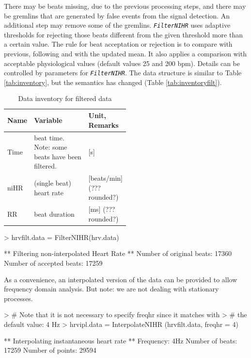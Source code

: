 \documentclass[a4paper, english, utf8]{amsart}
\newcommand\code[1]{\textsl{\texttt{#1}}}
\begin{document}
There may be beats missing, due to the previous processing steps, and there may be gremlins that are 
generated by false events from the signal detection. An additional step may remove  some of the gremlins. 
\code{FilterNIHR} uses adaptive thresholds for rejecting those beats different from the given threshold 
more than a certain value. The rule for beat acceptation or rejection is to compare with previous, following 
and with the updated mean. It also applies a comparison with acceptable physiological values (default 
values 25 and 200 bpm). Details can be controlled by parameters for \code{FilterNIHR}. The data 
structure is similar to Table \vref{tab:inventory}, 
but the semantics has changed (Table \vref{tab:inventoryfilt}).

\begin{table}
\begin{center}
\begin{tabular}{|l|p{0.5\linewidth}|l|}
\hline
\rowcolor[gray]{0.8}%
Name&Variable&Unit, Remarks\\
\hline
Time&beat time. Note: some beats have been filtered.&[s]\\
niHR&(single beat) heart rate&[beats/min] (??? rounded?)\\
RR&beat duration&[ms]  (??? rounded?)\\
\hline
\end{tabular}
\end{center}
\caption{Data inventory for filtered data}\label{tab:inventoryfilt}
\end{table}

\begin{Schunk}
\begin{Sinput}
> hrvfilt.data = FilterNIHR(hrv.data)
\end{Sinput}
\begin{Soutput}
** Filtering non-interpolated Heart Rate **
   Number of original beats: 17360 
   Number of accepted beats: 17259 
\end{Soutput}
\end{Schunk}

As a convenience, an interpolated version of the data can be provided to allow frequency domain analysis. But note: we are not dealing with stationary processes.

\begin{Schunk}
\begin{Sinput}
> # Note that it is not necessary to specify freqhr since it matches with
> # the default value: 4 Hz
> hrvipl.data = InterpolateNIHR (hrvfilt.data, freqhr = 4)
\end{Sinput}
\begin{Soutput}
** Interpolating instantaneous heart rate **
   Frequency: 4Hz
   Number of beats: 17259 
   Number of points: 29594 
\end{Soutput}
\end{Schunk}
\end{document}
